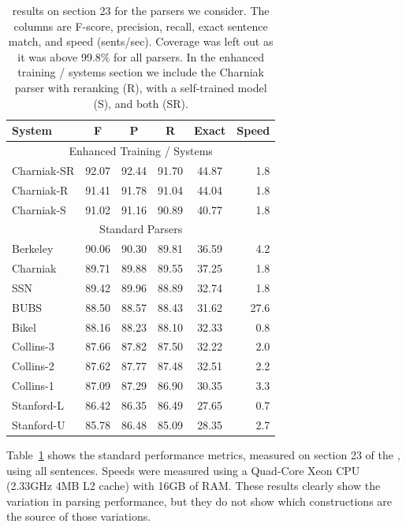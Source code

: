\begin{table}
\begin{center}
\begin{tabular}{|lccccr|}
	\hline
		System & F & P & R & Exact & Speed \\
	\hline
	\hline
		\multicolumn{6}{|c|}{Enhanced Training / Systems} \\
		Charniak-SR & 92.07 & 92.44 & 91.70 & 44.87 & 1.8 \\
		Charniak-R & 91.41 & 91.78 & 91.04 & 44.04 & 1.8 \\
		Charniak-S & 91.02 & 91.16 & 90.89 & 40.77 & 1.8 \\
	\hline
		\multicolumn{6}{|c|}{Standard Parsers} \\
		Berkeley & 90.06 & 90.30 & 89.81 & 36.59 & 4.2 \\
		Charniak & 89.71 & 89.88 & 89.55 & 37.25 & 1.8 \\
		SSN & 89.42 & 89.96 & 88.89 & 32.74 & 1.8 \\
		BUBS & 88.50 & 88.57 & 88.43 & 31.62 & 27.6 \\
		Bikel & 88.16 & 88.23 & 88.10 & 32.33 & 0.8 \\
		Collins-3 & 87.66 & 87.82 & 87.50 & 32.22 & 2.0 \\
		Collins-2 & 87.62 & 87.77 & 87.48 & 32.51 & 2.2 \\
		Collins-1 & 87.09 & 87.29 & 86.90 & 30.35 & 3.3 \\
		Stanford-L & 86.42 & 86.35 & 86.49 & 27.65 & 0.7 \\
		Stanford-U & 85.78 & 86.48 & 85.09 & 28.35 & 2.7 \\
	\hline
\end{tabular}
\caption{
	\label{tab:standard-results} \parseval results on \wsj section 23 for
	the parsers we consider.  The columns are F-score, precision, recall,
	exact sentence match, and speed (sents/sec).  Coverage was left out
	as it was above 99.8\% for all parsers.  In the {enhanced training /
	systems} section we include the Charniak parser with reranking (R), with a
	self-trained model (S), and both (SR).
}
\end{center}
\end{table}

Table~\ref{tab:standard-results} shows the standard performance metrics,
measured on section 23 of the \wsj, using all sentences.  Speeds were measured
using a Quad-Core Xeon CPU (2.33GHz 4MB L2 cache) with 16GB of RAM.
These results clearly show the variation in parsing performance, but they do
not show which constructions are the source of those variations.

